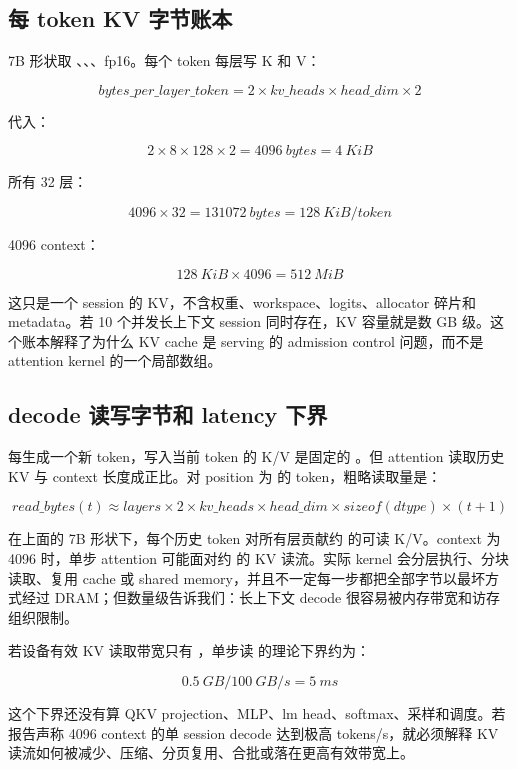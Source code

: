 \subsection{每 token KV 字节账本}

7B 形状取 、、、fp16。每个 token 每层写 K 和 V：

\[
bytes\_per\_layer\_token = 2 \times kv\_heads \times head\_dim \times 2
\]

代入：

\[
2 \times 8 \times 128 \times 2 = 4096\ bytes = 4\ KiB
\]

所有 32 层：

\[
4096 \times 32 = 131072\ bytes = 128\ KiB/token
\]

4096 context：

\[
128\ KiB \times 4096 = 512\ MiB
\]

这只是一个 session 的 KV，不含权重、workspace、logits、allocator 碎片和 metadata。若 10 个并发长上下文 session 同时存在，KV 容量就是数 GB 级。这个账本解释了为什么 KV cache 是 serving 的 admission control 问题，而不是 attention kernel 的一个局部数组。

\subsection{decode 读写字节和 latency 下界}

每生成一个新 token，写入当前 token 的 K/V 是固定的 。但 attention 读取历史 KV 与 context 长度成正比。对 position 为  的 token，粗略读取量是：

\[
read\_bytes(t) \approx layers \times 2 \times kv\_heads \times head\_dim \times sizeof(dtype) \times (t+1)
\]

在上面的 7B 形状下，每个历史 token 对所有层贡献约  的可读 K/V。context 为 4096 时，单步 attention 可能面对约  的 KV 读流。实际 kernel 会分层执行、分块读取、复用 cache 或 shared memory，并且不一定每一步都把全部字节以最坏方式经过 DRAM；但数量级告诉我们：长上下文 decode 很容易被内存带宽和访存组织限制。

若设备有效 KV 读取带宽只有 ，单步读  的理论下界约为：

\[
0.5\ GB / 100\ GB/s = 5\ ms
\]

这个下界还没有算 QKV projection、MLP、lm head、softmax、采样和调度。若报告声称 4096 context 的单 session decode 达到极高 tokens/s，就必须解释 KV 读流如何被减少、压缩、分页复用、合批或落在更高有效带宽上。

